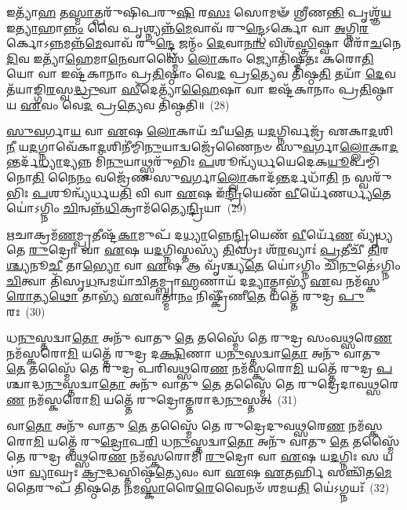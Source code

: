 𑌇𑌤𑍍𑌯𑌾᳴\-\ul{𑌹} 𑌤\-\ul{𑌸𑍍𑌮𑌾}\-𑌤𑍍𑌪𑌰𑍁᳴𑌷𑌿𑌪𑌰𑍁\-\ul{𑌷𑌿} 𑌰\-\ul{𑌸𑌃} 𑌸𑍋𑌮𑍟᳴ 𑌶𑍍𑌰𑍀𑌣\-\ul{𑌨𑍍𑌤𑌿} 𑌪𑍃𑌶𑍍𑌞᳴\-\ul{𑌯} 𑌇\-\ul{𑌤𑍍𑌯𑌾}\-𑌹𑌾\-\ul{𑌨𑍍𑌨𑌂} 𑌵𑍈 𑌪𑍃𑌶𑍍𑌨𑍍𑌯𑌨𑍍𑌨᳴\-\ul{𑌮𑍇}\-𑌵𑌾𑌵᳴ 𑌰𑍁\-\ul{𑌨𑍍𑌦𑍍𑌧𑍇}\-\-𑌽𑌰𑍍𑌕𑍋 𑌵𑌾 \ul{𑌅}\-𑌗𑍍𑌨𑌿\-\ul{𑌰}\-𑌰𑍍𑌕𑍋\-𑌽\-\ul{𑌨𑍍𑌨}\-𑌮𑌨𑍍𑌨᳴\-\ul{𑌮𑍇}\-𑌵𑌾𑌵᳴ 𑌰𑍁\-\ul{𑌨𑍍𑌦𑍍𑌧𑍇} 𑌜𑌨𑍍𑌮𑌂᳴ \ul{𑌦𑍇}\-𑌵𑌾\-\ul{𑌨𑌾𑌂} 𑌵𑌿𑌶᳴\-\ul{𑌸𑍍𑌤𑍍𑌰𑌿}\-𑌷𑍍𑌵𑌾 𑌰𑍋᳴\-\ul{𑌚}\-𑌨𑍇 \ul{𑌦𑌿}\-𑌵 𑌇𑌤𑍍𑌯𑌾᳴\-\ul{𑌹𑍇}\-𑌮𑌾\-\ul{𑌨𑍇}\-𑌵𑌾𑌸𑍍𑌮𑍈᳴ \ul{𑌲𑍋}\-𑌕𑌾𑌂 𑌜𑍍𑌯𑍋𑌤𑌿᳴𑌷𑍍𑌮𑌤𑌃 𑌕𑌰𑍋\-\ul{𑌤𑌿} 𑌯𑍋 𑌵𑌾 𑌇𑌷𑍍𑌟᳴𑌕𑌾𑌨𑌾𑌂 𑌪𑍍𑌰\-\ul{𑌤𑌿}\-𑌷𑍍𑌠𑌾𑌂 𑌵𑍇\-\ul{𑌦} 𑌪𑍍𑌰\-\ul{𑌤𑍍𑌯𑍇}\-𑌵 𑌤𑌿᳴𑌷𑍍𑌠\-\ul{𑌤𑌿} 𑌤𑌯𑌾᳴ \ul{𑌦𑍇}\-𑌵𑌤᳴𑌯𑌾𑌙𑍍𑌗𑌿\-\ul{𑌰}\-𑌸𑍍𑌵\-\ul{𑌦𑍍𑌧𑍍𑌰𑍁}\-𑌵𑌾 \ul{𑌸𑍀}\-𑌦𑍇𑌤𑍍𑌯𑌾᳴\-\ul{𑌹𑍈}\-𑌷𑌾 𑌵𑌾 𑌇𑌷𑍍𑌟᳴𑌕𑌾𑌨𑌾𑌂 𑌪𑍍𑌰\-\ul{𑌤𑌿}\-𑌷𑍍𑌠𑌾 𑌯 \ul{𑌏}\-𑌵𑌂 𑌵𑍇\-\ul{𑌦} 𑌪𑍍𑌰\-\ul{𑌤𑍍𑌯𑍇}\-𑌵 𑌤𑌿᳴𑌷𑍍𑌠𑌤𑌿॥~(28)

{\anuvakamend[{\-\ul{𑌰𑍂}\-𑌪𑌾\-\ul{𑌣𑌿} 𑌸𑍂𑌦᳴𑌦𑍋𑌹\-\ul{𑌸}\-𑌸𑍍𑌤\-\ul{𑌯𑌾} 𑌷𑍋𑌡᳴𑌶 𑌚}]}%

\-\ul{𑌸𑍁}\-\-\ul{𑌵}\-𑌰𑍍𑌗𑌾\-\ul{𑌯} 𑌵𑌾 \ul{𑌏}\-𑌷 \ul{𑌲𑍋}\-𑌕𑌾𑌯᳴ 𑌚𑍀𑌯\-\ul{𑌤𑍇} 𑌯\-\ul{𑌦}\-𑌗𑍍𑌨𑌿𑌰𑍍𑌵𑌜𑍍𑌰᳴ 𑌏𑌕𑌾\-\ul{𑌦}\-𑌶𑌿\-\ul{𑌨𑍀} 𑌯\-\ul{𑌦}\-𑌗𑍍𑌨𑌾𑌵𑍇᳴𑌕𑌾\-\ul{𑌦}\-𑌶𑌿𑌨𑍀॑𑌮𑍍𑌮𑌿\-\ul{𑌨𑍁}\-𑌯𑌾𑌦𑍍𑌵𑌜𑍍𑌰𑍇᳴𑌣𑍈𑌨𑍞 𑌸𑍁\-\ul{𑌵}\-𑌰𑍍𑌗𑌾\-\ul{𑌲𑍍𑌲𑍋}\-𑌕𑌾\-\-\ul{𑌦}\-𑌨𑍍𑌤𑌰𑍍𑌦᳴\-\ul{𑌧𑍍𑌯𑌾}\-𑌦𑍍𑌯𑌨𑍍𑌨 𑌮𑌿᳴\-\ul{𑌨𑍁}\-𑌯𑌾𑌥𑍍𑌸𑍍𑌵𑌰𑍁᳴𑌭𑌿𑌃 \ul{𑌪}\-𑌶𑍂𑌨𑍍𑌵𑍍𑌯᳴𑌰𑍍𑌧𑌯𑍇𑌦𑍇𑌕\-\ul{𑌯𑍂}\-𑌪𑌮𑍍𑌮𑌿᳴𑌨𑍋\-\ul{𑌤𑌿} 𑌨𑍈\-\ul{𑌨𑌂} 𑌵𑌜𑍍𑌰𑍇᳴𑌣 𑌸𑍁\-\ul{𑌵}\-𑌰𑍍𑌗𑌾\-\ul{𑌲𑍍𑌲𑍋}\-𑌕𑌾𑌦᳴\-\ul{𑌨𑍍𑌤}\-𑌰𑍍𑌦𑌧𑌾᳴\-\ul{𑌤𑌿} 𑌨 𑌸𑍍𑌵𑌰𑍁᳴𑌭𑌿𑌃 \ul{𑌪}\-𑌶𑍂𑌨𑍍𑌵𑍍𑌯᳴𑌰𑍍𑌧𑌯\-\ul{𑌤𑌿} 𑌵𑌿 𑌵𑌾 \ul{𑌏}\-𑌷 𑌇᳴\-\ul{𑌨𑍍𑌦𑍍𑌰𑌿}\-𑌯𑍇𑌣᳴ \ul{𑌵𑍀}\-𑌰𑍍𑌯𑍇᳴𑌣𑌰𑍍𑌧𑍍𑌯\-\ul{𑌤𑍇} 𑌯𑍋॑\-𑌽𑌗𑍍𑌨𑌿𑌂 \ul{𑌚𑌿}\-𑌨𑍍𑌵𑌨𑍍𑌨᳴\-\ul{𑌧𑌿}\-𑌕𑍍𑌰𑌾𑌮᳴𑌤𑍍𑌯𑍈\-\ul{𑌨𑍍𑌦𑍍𑌰𑌿}\-𑌯𑌾~(29)

\-\ul{𑌋}\-𑌚𑌾𑌕𑍍𑌰𑌮᳴\-\ul{𑌣}\-𑌮𑍍𑌪𑍍𑌰𑌤𑍀𑌷𑍍𑌟᳴\-\ul{𑌕𑌾}\-𑌮𑍁𑌪᳴ 𑌦\-\ul{𑌧𑍍𑌯𑌾}\-𑌨𑍍𑌨𑍇\-\ul{𑌨𑍍𑌦𑍍𑌰𑌿}\-𑌯𑍇𑌣᳴ \ul{𑌵𑍀}\-𑌰𑍍𑌯𑍇᳴\-\ul{𑌣} 𑌵𑍍𑌯𑍃᳴𑌧𑍍𑌯𑌤𑍇 \ul{𑌰𑍁}\-𑌦𑍍𑌰𑍋 𑌵𑌾 \ul{𑌏}\-𑌷 𑌯\-\ul{𑌦}\-𑌗𑍍𑌨𑌿𑌸𑍍𑌤𑌸𑍍𑌯᳴ \ul{𑌤𑌿}\-𑌸𑍍𑌰𑌃 𑌶᳴\-\ul{𑌰}\-𑌵𑍍𑌯𑌾𑌃॑ \ul{𑌪𑍍𑌰}\-𑌤𑍀𑌚𑍀᳴ \ul{𑌤𑌿}\-𑌰\-\ul{𑌶𑍍𑌚𑍍𑌯}\-𑌨𑍂\-\ul{𑌚𑍀} 𑌤𑌾\-\ul{𑌭𑍍𑌯𑍋} 𑌵𑌾 \ul{𑌏}\-𑌷 𑌆 𑌵𑍃᳴𑌶𑍍𑌚𑍍𑌯\-\ul{𑌤𑍇} 𑌯𑍋॑\-𑌽𑌗𑍍𑌨𑌿𑌂 𑌚𑌿᳴\-\ul{𑌨𑍁}\-𑌤𑍇॑\-𑌽𑌗𑍍𑌨𑌿𑌂 \ul{𑌚𑌿}\-𑌤𑍍𑌵𑌾 𑌤𑌿᳴𑌸𑍃\-\ul{𑌧}\-𑌨𑍍𑌵𑌮𑌯𑌾᳴𑌚𑌿𑌤𑌮𑍍𑌬𑍍𑌰𑌾\-\ul{𑌹𑍍𑌮}\-𑌣𑌾𑌯᳴ 𑌦\-\ul{𑌦𑍍𑌯𑌾}\-𑌤𑍍𑌤𑌾𑌭𑍍𑌯᳴ \ul{𑌏}\-𑌵 𑌨𑌮᳴𑌸𑍍𑌕\-\ul{𑌰𑍋}\-𑌤𑍍𑌯\-\ul{𑌥𑍋} 𑌤𑌾𑌭𑍍𑌯᳴ \ul{𑌏}\-𑌵𑌾𑌤𑍍𑌮𑌾\-\ul{𑌨𑌂} 𑌨𑌿𑌷𑍍𑌕𑍍𑌰𑍀᳴𑌣𑍀\-\ul{𑌤𑍇} 𑌯𑌤𑍍𑌤𑍇᳴ 𑌰𑍁𑌦𑍍𑌰 \ul{𑌪𑍁}\-𑌰𑌃~(30)

𑌧\-\ul{𑌨𑍁}\-𑌸𑍍𑌤𑌦𑍍𑌵𑌾\-\ul{𑌤𑍋} 𑌅𑌨𑍁᳴ 𑌵𑌾𑌤𑍁 \ul{𑌤𑍇} 𑌤𑌸𑍍𑌮𑍈᳴ 𑌤𑍇 𑌰𑍁𑌦𑍍𑌰 𑌸𑌂𑌵\-\ul{𑌥𑍍𑌸}\-𑌰𑍇\-\ul{𑌣} 𑌨𑌮᳴𑌸𑍍𑌕𑌰𑍋\-\ul{𑌮𑌿} 𑌯𑌤𑍍𑌤𑍇᳴ 𑌰𑍁𑌦𑍍𑌰 𑌦\-\ul{𑌕𑍍𑌷𑌿}\-𑌣𑌾 𑌧\-\ul{𑌨𑍁}\-𑌸𑍍𑌤𑌦𑍍𑌵𑌾\-\ul{𑌤𑍋} 𑌅𑌨𑍁᳴ 𑌵𑌾𑌤𑍁 \ul{𑌤𑍇} 𑌤𑌸𑍍𑌮𑍈᳴ 𑌤𑍇 𑌰𑍁𑌦𑍍𑌰 𑌪𑌰𑌿𑌵\-\ul{𑌥𑍍𑌸}\-𑌰𑍇\-\ul{𑌣} 𑌨𑌮᳴𑌸𑍍𑌕𑌰𑍋\-\ul{𑌮𑌿} 𑌯𑌤𑍍𑌤𑍇᳴ 𑌰𑍁𑌦𑍍𑌰 \ul{𑌪}\-𑌶𑍍𑌚𑌾𑌦𑍍𑌧\-\ul{𑌨𑍁}\-𑌸𑍍𑌤𑌦𑍍𑌵𑌾\-\ul{𑌤𑍋} 𑌅𑌨𑍁᳴ 𑌵𑌾𑌤𑍁 \ul{𑌤𑍇} 𑌤𑌸𑍍𑌮𑍈᳴ 𑌤𑍇 𑌰𑍁𑌦𑍍𑌰𑍇𑌦𑌾𑌵\-\ul{𑌥𑍍𑌸}\-𑌰𑍇\-\ul{𑌣} 𑌨𑌮᳴𑌸𑍍𑌕𑌰𑍋\-\ul{𑌮𑌿} 𑌯𑌤𑍍𑌤𑍇᳴ 𑌰𑍁𑌦𑍍𑌰𑍋\-\ul{𑌤𑍍𑌤}\-𑌰𑌾𑌦𑍍𑌧\-\ul{𑌨𑍁}\-𑌸𑍍𑌤𑌤𑍍~(31)

𑌵𑌾\-\ul{𑌤𑍋} 𑌅𑌨𑍁᳴ 𑌵𑌾𑌤𑍁 \ul{𑌤𑍇} 𑌤𑌸𑍍𑌮𑍈᳴ 𑌤𑍇 𑌰𑍁𑌦𑍍𑌰𑍇𑌦𑍁𑌵\-\ul{𑌥𑍍𑌸}\-𑌰𑍇\-\ul{𑌣} 𑌨𑌮᳴𑌸𑍍𑌕𑌰𑍋\-\ul{𑌮𑌿} 𑌯𑌤𑍍𑌤𑍇᳴ 𑌰𑍁\-\ul{𑌦𑍍𑌰𑍋}\-𑌪\-\ul{𑌰𑌿} 𑌧\-\ul{𑌨𑍁}\-𑌸𑍍𑌤𑌦𑍍𑌵𑌾\-\ul{𑌤𑍋} 𑌅𑌨𑍁᳴ 𑌵𑌾𑌤𑍁 \ul{𑌤𑍇} 𑌤𑌸𑍍𑌮𑍈᳴ 𑌤𑍇 𑌰𑍁𑌦𑍍𑌰 𑌵\-\ul{𑌥𑍍𑌸}\-𑌰𑍇\-\ul{𑌣} 𑌨𑌮᳴𑌸𑍍𑌕𑌰𑍋𑌮𑌿 \ul{𑌰𑍁}\-𑌦𑍍𑌰𑍋 𑌵𑌾 \ul{𑌏}\-𑌷 𑌯\-\ul{𑌦}\-𑌗𑍍𑌨𑌿𑌃 𑌸 𑌯𑌥𑌾॑ \ul{𑌵𑍍𑌯𑌾}\-𑌘𑍍𑌰𑌃 \ul{𑌕𑍍𑌰𑍁}\-𑌦𑍍𑌧𑌸𑍍𑌤𑌿𑌷𑍍𑌠᳴\-\ul{𑌤𑍍𑌯𑍇}\-𑌵𑌂 𑌵𑌾 \ul{𑌏}\-𑌷 \ul{𑌏}\-𑌤𑌰𑍍\mbox{}\-\ul{𑌹𑌿} 𑌸𑌞𑍍𑌚𑌿᳴𑌤\-\ul{𑌮𑍇}\-𑌤𑍈𑌰𑍁𑌪᳴ 𑌤𑌿𑌷𑍍𑌠𑌤𑍇 𑌨𑌮\-\ul{𑌸𑍍𑌕𑌾}\-𑌰𑍈\-\ul{𑌰𑍇}\-𑌵𑍈𑌨𑍞᳴ 𑌶𑌮𑌯\-\ul{𑌤𑌿} 𑌯𑍇॑\-𑌽𑌗𑍍𑌨𑌯𑌃᳴~(32)


